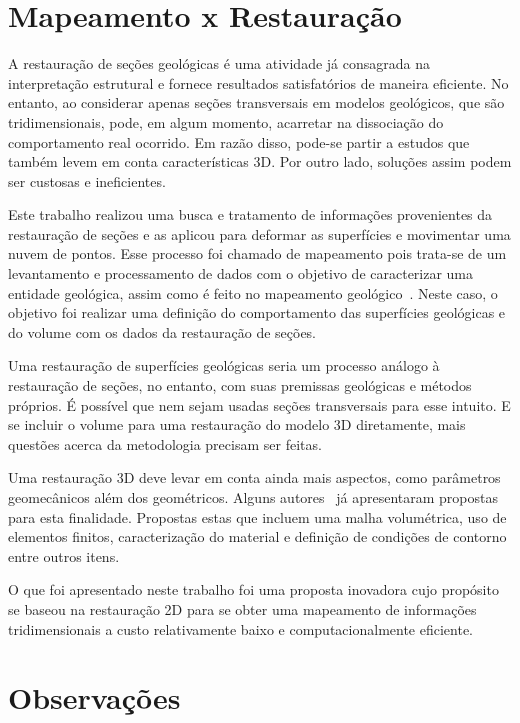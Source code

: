 \section{Mapeamento x Restauração}

A restauração de seções geológicas é uma atividade já consagrada na interpretação estrutural e fornece resultados satisfatórios de maneira eficiente. No entanto, ao considerar apenas seções transversais em modelos geológicos, que são tridimensionais, pode, em algum momento, acarretar na dissociação do comportamento real ocorrido. Em razão disso, pode-se partir a estudos que também levem em conta características 3D. Por outro lado, soluções assim podem ser custosas e ineficientes.

Este trabalho realizou uma busca e tratamento de informações provenientes da restauração de seções e as aplicou para deformar as superfícies e movimentar uma nuvem de pontos. Esse processo foi chamado de mapeamento pois trata-se de um levantamento e processamento de dados com o objetivo de caracterizar uma entidade geológica, assim como é feito no mapeamento geológico~\cite{Geoscan}. Neste caso, o objetivo foi realizar uma definição do comportamento das superfícies geológicas e do volume com os dados da restauração de seções.

Uma restauração de superfícies geológicas seria um processo análogo à restauração de seções, no entanto, com suas premissas geológicas e métodos próprios. É possível que nem sejam usadas seções transversais para esse intuito. E se incluir o volume para uma restauração do modelo 3D diretamente, mais questões acerca da metodologia precisam ser feitas. 

Uma restauração 3D deve levar em conta ainda mais aspectos, como parâmetros geomecânicos além dos geométricos. Alguns autores~\cite{Santi_3dgeological, Massot, DURANDRIARD2010441} já apresentaram propostas para esta finalidade. Propostas estas que incluem uma malha volumétrica, uso de elementos finitos, caracterização do material e definição de condições de contorno entre outros itens.

O que foi apresentado neste trabalho foi uma proposta inovadora cujo propósito se baseou na restauração 2D para se obter uma mapeamento de informações tridimensionais a custo relativamente baixo e computacionalmente eficiente.

\section{Observações}

